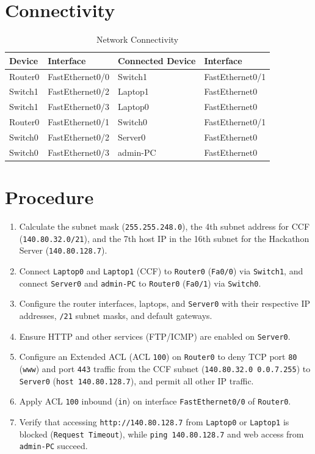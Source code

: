\documentclass[12pt, a4paper]{report}
\begin{document}
\section*{Connectivity}
\begin{table}[H]
	\centering
	\begin{tabular}{|l|l|l|l|}
		\hline
		\textbf{Device} & \textbf{Interface} & \textbf{Connected Device} & \textbf{Interface} \\ \hline
		Router0  & FastEthernet0/0 & Switch1 & FastEthernet0/1 \\ \hline
		Switch1  & FastEthernet0/2 & Laptop1 & FastEthernet0   \\ \hline
		Switch1  & FastEthernet0/3 & Laptop0 & FastEthernet0   \\ \hline
		Router0  & FastEthernet0/1 & Switch0 & FastEthernet0/1 \\ \hline
		Switch0  & FastEthernet0/2 & Server0 & FastEthernet0   \\ \hline
		Switch0  & FastEthernet0/3 & admin-PC & FastEthernet0  \\ \hline
	\end{tabular}
	\caption{Network Connectivity}
\end{table}

\section*{Procedure}
\begin{enumerate}
	\item Calculate the subnet mask (\texttt{255.255.248.0}), the 4th subnet address for CCF (\texttt{140.80.32.0/21}), and the 7th host IP in the 16th subnet for the Hackathon Server (\texttt{140.80.128.7}).
	\item Connect \texttt{Laptop0} and \texttt{Laptop1} (CCF) to \texttt{Router0} (\texttt{Fa0/0}) via \texttt{Switch1}, and connect \texttt{Server0} and \texttt{admin-PC} to \texttt{Router0} (\texttt{Fa0/1}) via \texttt{Switch0}.
	\item Configure the router interfaces, laptops, and \texttt{Server0} with their respective IP addresses, \texttt{/21} subnet masks, and default gateways.
	\item Ensure HTTP and other services (FTP/ICMP) are enabled on \texttt{Server0}.
	\item Configure an Extended ACL (ACL \texttt{100}) on \texttt{Router0} to deny TCP port \texttt{80} (\texttt{www}) and port \texttt{443} traffic from the CCF subnet (\texttt{140.80.32.0 0.0.7.255}) to \texttt{Server0} (\texttt{host 140.80.128.7}), and permit all other IP traffic.
	\item Apply ACL \texttt{100} inbound (\texttt{in}) on interface \texttt{FastEthernet0/0} of \texttt{Router0}.
	\item Verify that accessing \texttt{http://140.80.128.7} from \texttt{Laptop0} or \texttt{Laptop1} is blocked (\texttt{Request Timeout}), while \texttt{ping 140.80.128.7} and web access from \texttt{admin-PC} succeed.
\end{enumerate}
\end{document}
